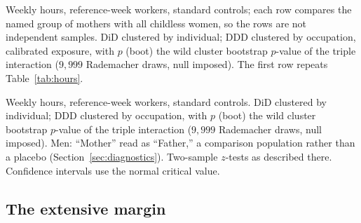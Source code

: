 \documentclass[12pt,a4paper]{article}
\begin{document}
\begin{table}[htbp]
\centering
\begin{threeparttable}
\caption{Hours DiD and DDD by age of the youngest child}\label{tab:childage}
\renewcommand{\baselinestretch}{1}\small
\setlength{\tabcolsep}{3pt}

\begin{tablenotes}\small
\item Weekly hours, reference-week workers, standard controls; each row compares the named group
of mothers with all childless women, so the rows are not independent samples. DiD clustered by
individual; DDD clustered by occupation, calibrated exposure, with $p$ (boot) the wild cluster
bootstrap $p$-value of the triple interaction ($9{,}999$ Rademacher draws, null imposed). The
first row repeats Table~\ref{tab:hours}. \autonoteChildAge
\end{tablenotes}
\end{threeparttable}
\end{table}

\begin{table}[htbp]
\centering
\begin{threeparttable}
\caption{Hours DiD and DDD by subgroup, and the fathers' comparison}\label{tab:subgroup}
\renewcommand{\baselinestretch}{1}\footnotesize
\setlength{\tabcolsep}{3pt} %

\begin{tablenotes}\small
\item Weekly hours, reference-week workers, standard controls. DiD clustered by individual; DDD
clustered by occupation, with $p$ (boot) the wild cluster bootstrap $p$-value of the triple
interaction ($9{,}999$ Rademacher draws, null imposed). Men: ``Mother'' read as ``Father,'' a comparison population rather than
a placebo (Section~\ref{sec:diagnostics}). Two-sample $z$-tests as described there. Confidence
intervals use the normal critical value. \autonoteSubgroup
\end{tablenotes}
\end{threeparttable}
\end{table}

\subsection{The extensive margin}\label{sec:res-extensive}
\end{document}
